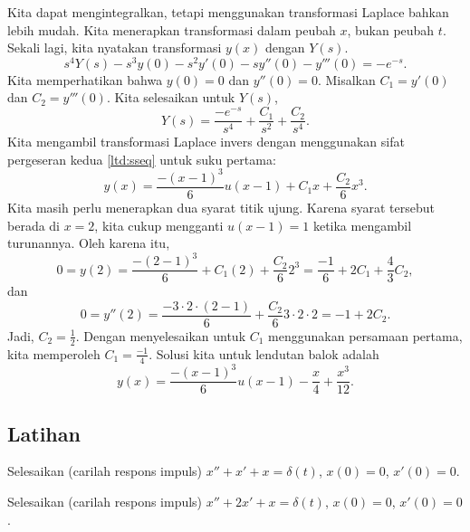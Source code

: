 \begin{example}
Kita dapat mengintegralkan, tetapi menggunakan transformasi Laplace
bahkan lebih mudah.
Kita menerapkan transformasi
dalam peubah $x$, bukan peubah $t$.  Sekali lagi, kita nyatakan
transformasi $y(x)$ dengan $Y(s)$.
\begin{equation*}
s^4Y(s)-s^3y(0)-s^2y'(0)-sy''(0)-y'''(0)
= -e^{-s}.
\end{equation*}
Kita memperhatikan bahwa $y(0) = 0$ dan $y''(0) = 0$.  Misalkan
$C_1 = y'(0)$ dan $C_2=y'''(0)$.
Kita selesaikan untuk $Y(s)$,
\begin{equation*}
Y(s) = \frac{-e^{-s}}{s^4} + \frac{C_1}{s^2}+ \frac{C_2}{s^4} .
\end{equation*}
Kita mengambil transformasi Laplace invers dengan menggunakan 
sifat pergeseran kedua \eqref{ltd:sseq} untuk suku
pertama:
\begin{equation*}
y(x) = \frac{-{(x-1)}^3}{6} u(x-1) + C_1 x + \frac{C_2}{6} x^3 .
\end{equation*}
Kita masih perlu menerapkan dua syarat titik ujung.  Karena syarat tersebut
berada di $x=2$, kita cukup mengganti $u(x-1) = 1$ ketika mengambil
turunannya.  Oleh karena itu,
\begin{equation*}
0 = y(2) = \frac{-{(2-1)}^3}{6} + C_1 (2) + \frac{C_2}{6} 2^3 =
\frac{-1}{6} + 2 C_1 + \frac{4}{3} C_2 ,
\end{equation*}
dan
\begin{equation*}
0 = y''(2) = \frac{-3\cdot 2 \cdot (2-1)}{6} + \frac{C_2}{6} 3\cdot 2 \cdot 2
 = -1 + 2 C_2 .
\end{equation*}
Jadi, $C_2 = \frac{1}{2}$.
Dengan menyelesaikan untuk $C_1$ menggunakan persamaan pertama, kita memperoleh
$C_1 = \frac{-1}{4}$.  Solusi kita untuk lendutan balok adalah
\begin{equation*}
y(x) = \frac{-{(x-1)}^3}{6} u(x-1) - \frac{x}{4} + \frac{x^3}{12} .
\end{equation*}
\end{example}

\subsection{Latihan}

\begin{exercise}
Selesaikan (carilah respons impuls)
$x'' + x' + x = \delta(t)$, $x(0) = 0$, $x'(0)=0$.
\end{exercise}

\begin{exercise}
Selesaikan (carilah respons impuls)
$x'' + 2 x' + x = \delta(t)$, $x(0) = 0$, $x'(0)=0$.
\end{exercise}

